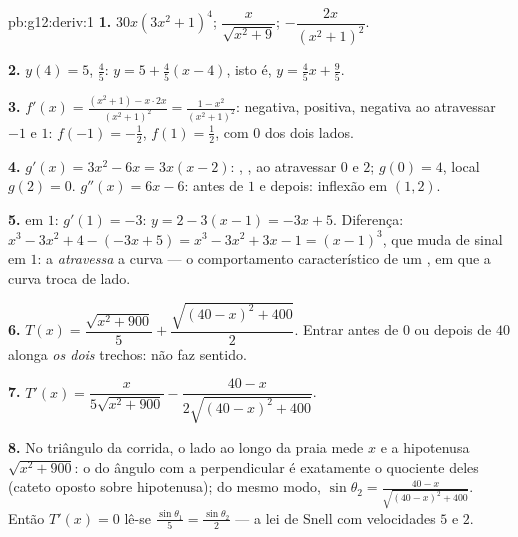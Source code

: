 \begin{solution}{pb:g12:deriv:1}
\textbf{1.} $30x\left(3x^2 + 1\right)^4$; \quad
$\dfrac{x}{\sqrt{x^2 + 9}}$; \quad
$-\dfrac{2x}{\left(x^2 + 1\right)^2}$.

\textbf{2.} $y(4) = 5$,  $\frac45$: 
$y = 5 + \frac45(x - 4)$, isto é, $y = \frac45 x + \frac95$.

\textbf{3.} $f'(x) = \frac{(x^2 + 1) - x \cdot 2x}{(x^2+1)^2}
= \frac{1 - x^2}{(x^2 + 1)^2}$: negativa, positiva, negativa ao
atravessar $-1$ e $1$:  $f(-1) = -\frac12$, 
$f(1) = \frac12$, com  $0$ dos dois lados.

\textbf{4.} $g'(x) = 3x^2 - 6x = 3x(x - 2)$: ,
,  ao atravessar $0$ e $2$; 
$g(0) = 4$,  local $g(2) = 0$. $g''(x) = 6x - 6$: 
antes de $1$ e  depois: inflexão em $(1, 2)$.

\textbf{5.}  em $1$:  $g'(1) = -3$:
$y = 2 - 3(x - 1) = -3x + 5$. Diferença:
$x^3 - 3x^2 + 4 - (-3x + 5) = x^3 - 3x^2 + 3x - 1 =
(x - 1)^3$, que muda de sinal em $1$: a 
\emph{atravessa} a curva --- o comportamento característico de
um , em que a curva troca de lado.

\textbf{6.} $T(x) = \dfrac{\sqrt{x^2 + 900}}{5} +
\dfrac{\sqrt{(40 - x)^2 + 400}}{2}$. Entrar antes de $0$ ou
depois de $40$ alonga \emph{os dois} trechos: não faz sentido.

\textbf{7.} $T'(x) = \dfrac{x}{5\sqrt{x^2 + 900}} -
\dfrac{40 - x}{2\sqrt{(40 - x)^2 + 400}}$.

\textbf{8.} No triângulo da corrida, o lado ao longo da praia
mede $x$ e a hipotenusa $\sqrt{x^2 + 900}$: o  do ângulo com
a perpendicular é exatamente o quociente deles (cateto oposto
sobre hipotenusa); do mesmo modo,
$\sin\theta_2 = \frac{40 - x}{\sqrt{(40-x)^2 + 400}}$. Então
$T'(x) = 0$ lê-se
$\frac{\sin\theta_1}{5} = \frac{\sin\theta_2}{2}$ --- a lei de
Snell com velocidades $5$ e $2$.


\end{solution}

